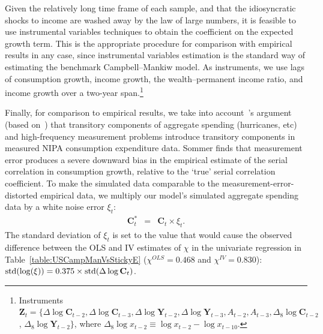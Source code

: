 \documentclass[titlepage]{./econtex}
\begin{document}
Given the relatively long time frame of each sample, and that the idiosyncratic shocks to income are washed away by the law of large numbers, it is feasible to use instrumental variables techniques to obtain the coefficient on the expected growth term.  This is the appropriate procedure for comparison with empirical results in any case, since instrumental variables estimation is the standard way of estimating the benchmark Campbell--Mankiw model.  As instruments, we use lags of consumption growth, income growth, the wealth--permanent income ratio, and income growth over a two-year span.\footnote{Instruments $\textbf{Z}_t = \{\Delta \log \mathbf{C}_{t-2}, \Delta \log \mathbf{C}_{t-3}, \Delta \log \mathbf{Y}_{t-2}, \Delta \log \mathbf{Y}_{t-3}, A_{t-2}, A_{t-3}, \Delta_8 \log \mathbf{C}_{t-2}$, $\Delta_8 \log \mathbf{Y}_{t-2} \}$, where $\Delta_8 \log x_{t-2}\equiv \log x_{t-2}-\log x_{t-10}$.}

Finally, for comparison to empirical results, we take into account~\cite{som07}'s argument (based on~\cite{wilcox:aer}) that transitory components of aggregate spending (hurricanes, etc) and high-frequency measurement problems introduce transitory components in measured NIPA consumption expenditure data.  Sommer finds that measurement error produces a severe downward bias in the empirical estimate of the serial correlation in consumption growth, relative to the `true' serial correlation coefficient.  To make the simulated data comparable to the measurement-error-distorted empirical data, we multiply our model's simulated aggregate spending data by a white noise error $\xi_t$:
\begin{eqnarray*}
	{\mathbf{C}}^*_{t} & = & \mathbf{C}_{t}\times\xi_{t}.
\end{eqnarray*}
The standard deviation of $\xi_t$ is set to the value that would cause the observed difference between the OLS and IV estimates of $\chi$ in the univariate regression in Table~\ref{table:USCampManVsStickyE} ($\chi^{OLS}=0.468$ and $\chi^{IV}=0.830$): $\operatorname{std}(\log(\xi))= 0.375\times\operatorname{std}(\Delta \log \mathbf{C}_t)$.
\end{document}
